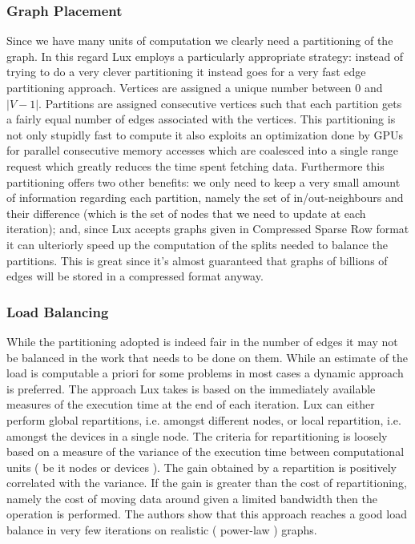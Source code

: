 \documentclass[]{article}
\begin{document}
\subsubsection{Graph Placement}
Since we have many units of computation we clearly need a partitioning of the graph. In this regard Lux employs a particularly appropriate strategy: instead of trying to do a very clever partitioning it instead goes for a very fast edge partitioning approach. Vertices are assigned a unique number between $0$ and $|V-1|$. Partitions are assigned consecutive vertices such that each partition gets a fairly equal number of edges associated with the vertices. This partitioning is not only stupidly fast to compute it also exploits an optimization done by GPUs for parallel consecutive memory accesses which are coalesced into a single range request which greatly reduces the time spent fetching data. Furthermore this partitioning offers two other benefits: we only need to keep a very small amount of information regarding each partition, namely the set of in/out-neighbours and their difference (which is the set of nodes that we need to update at each iteration); and, since Lux accepts graphs given in Compressed Sparse Row format it can ulteriorly speed up the computation of the splits needed to balance the partitions. This is great since it's almost guaranteed that graphs of billions of edges will be stored in a compressed format anyway.
\subsubsection{Load Balancing}
While the partitioning adopted is indeed fair in the number of edges it may not be balanced in the work that needs to be done on them. While an estimate of the load is computable a priori for some problems in most cases a dynamic approach is preferred. The approach Lux takes is based on the immediately available measures of the execution time at the end of each iteration. Lux can either perform global repartitions, i.e. amongst different nodes, or local repartition, i.e. amongst the devices in a single node. The criteria for repartitioning is loosely based on a measure of the variance of the execution time between computational units ( be it nodes or devices ). The gain obtained by a repartition is positively correlated with the variance. If the gain is greater than the cost of repartitioning, namely the cost of moving data around given a limited bandwidth then the operation is performed. The authors show that this approach reaches a good load balance in very few iterations on realistic ( power-law ) graphs.
\end{document}
